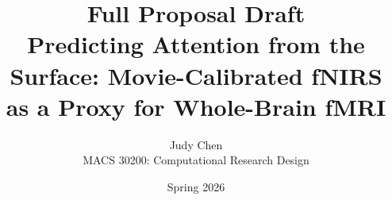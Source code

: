 \documentclass[12pt]{article}
\title{\textbf{Full Proposal Draft} \\
\large Predicting Attention from the Surface: Movie-Calibrated fNIRS as a Proxy for Whole-Brain fMRI}
\author{Judy Chen \\ MACS 30200: Computational Research Design}
\date{Spring 2026}
\begin{document}
\maketitle
\onehalfspacing
 

 

 

 

 

 

 

 

 
\printbibliography
 
\end{document}
